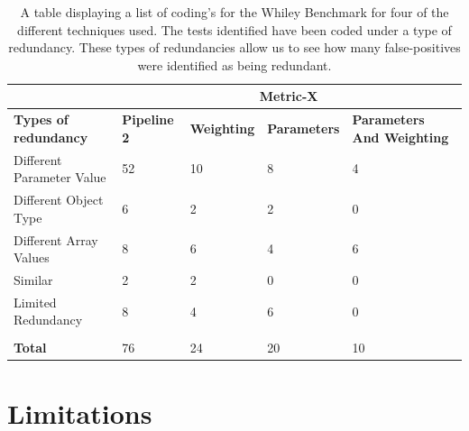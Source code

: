 \begin{table}[]
\centering
\begin{tabular}{|l|l|l|l|l|}
\hline
                             & \multicolumn{4}{c|}{\textbf{Metric-X}}                                                              \\ \hline
\textbf{Types of redundancy} & \textbf{Pipeline 2} & \textbf{Weighting} & \textbf{Parameters} & \textbf{Parameters  And Weighting} \\ \hline
Different Parameter Value    & 52                  & 10                 & 8                   & 4                                  \\ \hline
Different Object Type        & 6                   & 2                  & 2                   & 0                                  \\ \hline
Different Array Values       & 8                   & 6                  & 4                   & 6                                  \\ \hline
Similar                      & 2                   & 2                  & 0                   & 0                                  \\ \hline
Limited Redundancy           & 8                   & 4                  & 6                   & 0                                  \\ \hline
\textbf{}                    &                     &                    &                     &                                    \\ \hline
\textbf{Total}               & 76                  & 24                 & 20                  & 10                                 \\ \hline
\end{tabular}
\caption{A table displaying a list of coding's for the Whiley Benchmark for four of the different techniques used. The tests identified have been coded under a type of redundancy. These types of redundancies allow us to see how many false-positives were identified as being redundant.}
\label{metriccoding}
\end{table}

\section{Limitations}

